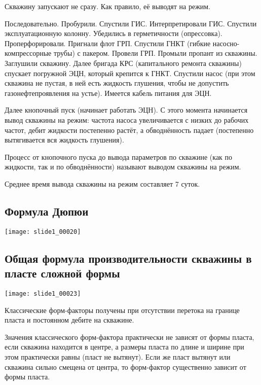 \documentclass[main.tex]{subfiles}
\begin{document}
Скважину запускают не сразу. Как правило, её выводят на режим.

Последовательно. Пробурили. Спустили ГИС. Интерпретировали ГИС. Спустили эксплуатационную колонну. Убедились в герметичности (опрессовка). Проперфорировали. Пригнали флот ГРП. Спустили ГНКТ (гибкие насосно-компрессорные трубы) с пакером. Провели ГРП. Промыли пропант из скважины. Заглушили скважину. Далее бригада КРС (капитального ремонта скважины) спускает погружной ЭЦН, который крепится к ГНКТ. Спустили насос (при этом скважина не пустая, в ней есть жидкость глушения, чтобы не допустить газонефтепроявления на устье). Имеется кабель питания для ЭЦН.

Далее кнопочный пуск (начинает работать ЭЦН). С этого момента начинается вывод скважины на режим: частота насоса увеличивается с низких до рабочих частот, дебит жидкости постепенно растёт, а обводнённость падает (постепенно вытягивается вся жидкость глушения).

Процесс от кнопочного пуска до вывода параметров по скважине (как по жидкости, так и по обводнённости) называют выводом скважины на режим.

Среднее время вывода скважины на режим составляет 7 суток.

\subsection{Формула Дюпюи}
\texttt{[image: slide1\_00020]}



\subsection{Общая формула производительности скважины в пласте сложной формы}

\texttt{[image: slide1\_00023]}



Классические форм-факторы получены при отсутствии перетока на границе пласта и постоянном дебите на скважине.

Значения классического форм-фактора практически не зависят от формы пласта, если скважина находится в центре, а размеры пласта по длине и ширине при этом практически равны (пласт не вытянут). Если же пласт вытянут или скважина сильно смещена от центра, то форм-фактор существенно зависит от формы пласта.\\
\end{document}
